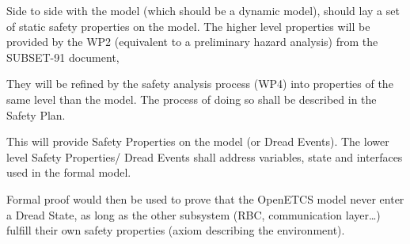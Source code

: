 \begin{justif}
Side to side with the model (which should be a dynamic model), should lay a set of  
static safety properties on the model. The higher level properties will be provided 
by the WP2 (equivalent to a preliminary hazard analysis) from the SUBSET-91 document, 

They will be refined by the safety analysis process (WP4) into properties of the same 
level than the model. The process of doing so shall be described in the Safety Plan.

This will provide Safety Properties on the model (or Dread Events). The lower level Safety Properties/
Dread Events shall address variables, state and interfaces used in the formal model.

Formal proof would then be used to prove that the OpenETCS model never enter a Dread State, 
as long as the other subsystem (RBC, communication layer\dots) fulfill their own safety properties
(axiom describing the environment).
\end{justif}

\begin{comment}
MPD : Identification of Vital and non vital  can be done only if the safety  analysers have provided safety properties and have allocated them to  functions.
\end{comment}

